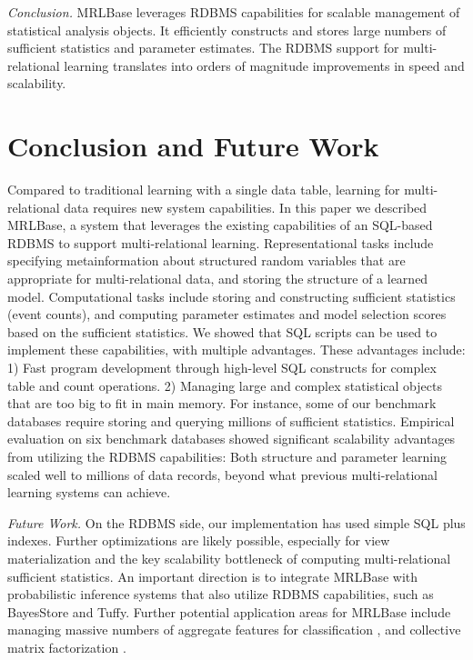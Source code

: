 \documentclass{acm_proc_article-sp}
\begin{document}
{\em Conclusion.} MRLBase leverages RDBMS capabilities for scalable management of statistical analysis objects. It efficiently constructs and stores large numbers of sufficient statistics and parameter estimates. 
The RDBMS support for multi-relational learning translates into orders of magnitude improvements in speed and scalability.


\section{Conclusion and Future Work} 
Compared to traditional learning with a single data table, learning for multi-relational data requires new system capabilities. In this paper we described MRLBase, a system that leverages the existing capabilities of an SQL-based RDBMS to support multi-relational learning.
Representational tasks include specifying metainformation about structured random variables that are appropriate for multi-relational data, and storing the structure of a learned model. Computational tasks include storing and constructing sufficient statistics (event counts), and computing parameter estimates and model selection scores based on the sufficient statistics. 
We showed that SQL scripts can be used to implement these capabilities, with multiple advantages. These advantages include: 1) Fast program development through high-level SQL constructs for complex table and count operations. 2) Managing large and complex statistical objects that are too big to fit in main memory. 
For instance, some of our benchmark databases require storing and querying millions of sufficient statistics. 
Empirical evaluation on six benchmark databases showed significant scalability advantages from utilizing the RDBMS capabilities: Both structure and parameter learning scaled well to millions of data records, beyond what previous multi-relational learning systems can achieve. 

{\em Future Work.} On the RDBMS side, our implementation has used simple SQL plus indexes. Further optimizations are likely possible, especially for view materialization and the key scalability bottleneck of computing multi-relational sufficient statistics. An important direction is to integrate MRLBase with probabilistic inference systems that also utilize RDBMS capabilities, such as BayesStore and Tuffy. Further potential application areas for MRLBase include managing massive numbers of aggregate features for classification \cite{Popescul2007}, and collective matrix factorization \cite{Singh2008}. 
\end{document}
